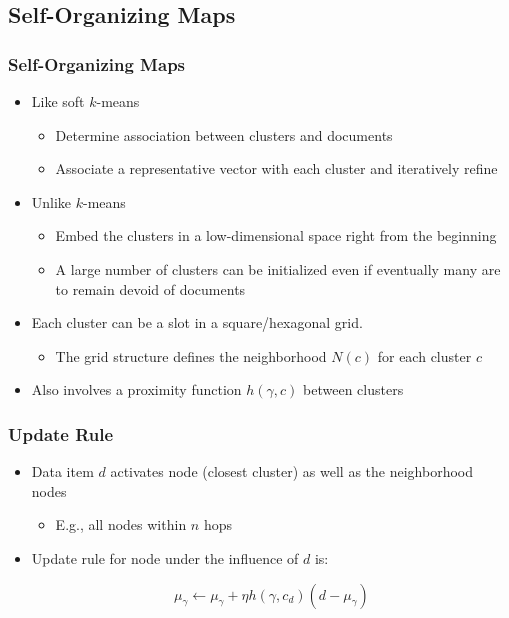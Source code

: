\documentclass{beamer}
\begin{document}

\subsection{Self-Organizing Maps}

\begin{frame}
  \frametitle{Self-Organizing Maps}

  \begin{itemize}
  \item Like soft $k$-means
    \begin{itemize}
    \item Determine association between clusters and documents
    \item Associate a representative vector with each cluster and iteratively
      refine
    \end{itemize}
  \item Unlike $k$-means
    \begin{itemize}
    \item Embed the clusters in a low-dimensional space right from the
      beginning
    \item A large number of clusters can be initialized even if eventually many
      are to remain devoid of documents
    \end{itemize}
  \item Each cluster can be a slot in a square/hexagonal grid.
    \begin{itemize}
    \item The grid structure defines the neighborhood $N(c)$ for each cluster
      $c$
    \end{itemize}
  \item Also involves a proximity function $h(\gamma,c)$ between clusters
  \end{itemize}

\end{frame}


\begin{frame}
  \frametitle{Update Rule}

  \begin{itemize}
  \item Data item $d$ activates node (closest cluster) as well as the
    neighborhood nodes
    \begin{itemize}
    \item E.g., all nodes within $n$ hops
    \end{itemize}
  \item Update rule for node under the influence of $d$ is:
    \begin{block}{}
      \begin{displaymath}
        \mu_\gamma \leftarrow \mu_\gamma + \eta h(\gamma,c_d)(d - \mu_\gamma)
      \end{displaymath}
    \end{block}
  \end{itemize}
    
\end{frame}
\end{document}

